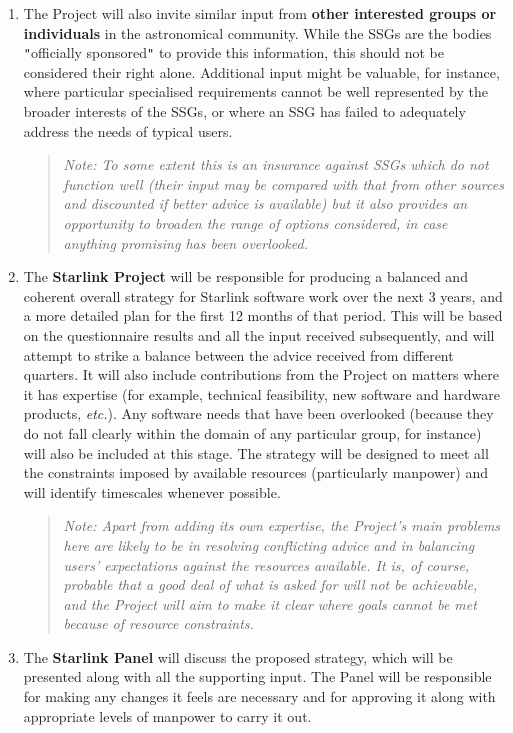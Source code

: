 \documentclass[11pt]{article}
\newcommand{\htmladdnormallink}[2]{#1}
\newcommand{\xref}[3]{#1}
\newcommand{\planref}[1]{\htmladdnormallink{#1}{http://star-www.rl.ac.uk/\~{}rfws/projects/planitems.html}}
\newcommand{\st}[1]{{\em{#1}}}
\newcommand{\qt}[1]{``#1''}
\renewcommand{\qt}[1]{{\tt{"}}#1{\tt{"}}}
\begin{document}
\begin{enumerate}
\item The Project will also invite similar input from {\bf other
interested groups or individuals} in the astronomical community.  While
the SSGs are the bodies \qt{officially sponsored} to provide this
information, this should not be considered their right
alone. Additional input might be valuable, for instance, where
particular specialised requirements cannot be well represented by the
broader interests of the SSGs, or where an SSG has failed to
adequately address the needs of typical users.

\begin{quote}
\st{Note: To some extent this is an insurance against SSGs which do
not function well (their input may be compared with that from other
sources and discounted if better advice is available) but it also
provides an opportunity to broaden the range of options considered, in
case anything promising has been overlooked.}
\end{quote}

\item The {\bf Starlink Project} will be responsible for producing a
balanced and coherent overall \xref{strategy}{sgp42}{} for Starlink
software work over the next 3 years, and a more detailed
\planref{plan} for the first 12 months of that period. This will be
based on the questionnaire results and all the input received
subsequently, and will attempt to strike a balance between the advice
received from different quarters. It will also include contributions
from the Project on matters where it has expertise (for example,
technical feasibility, new software and hardware products,
\st{etc.}). Any software needs that have been overlooked (because they
do not fall clearly within the domain of any particular group, for
instance) will also be included at this stage. The strategy will be
designed to meet all the constraints imposed by available resources
(particularly manpower) and will identify timescales whenever
possible.

\begin{quote}
\st{Note: Apart from adding its own expertise, the Project's main
problems here are likely to be in resolving conflicting advice and in
balancing users' expectations against the resources available. It is,
of course, probable that a good deal of what is asked for will not be
achievable, and the Project will aim to make it clear where goals
cannot be met because of resource constraints.}
\end{quote}

\item The {\bf Starlink Panel} will discuss the proposed strategy, which
will be presented along with all the supporting input. The Panel will be
responsible for making any changes it feels are necessary and for
approving it along with appropriate levels of manpower to carry it out.


\end{enumerate}
\end{document}
